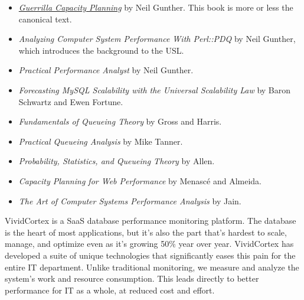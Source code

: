 \documentclass{vivid_layout}
\begin{document}
\begin{itemize}
\item \href{http://www.springer.com/book/978-3-540-26138-4}{\itshape Guerrilla Capacity Planning} by Neil Gunther. This book is more or less the canonical text.
\item {\itshape Analyzing Computer System Performance With Perl::PDQ} by Neil
Gunther, which introduces the background to the USL.
\item {\itshape Practical Performance Analyst} by Neil Gunther.
\item {\itshape Forecasting MySQL Scalability with the Universal Scalability Law} by Baron Schwartz and Ewen Fortune.
\item {\itshape Fundamentals of Queueing Theory} by Gross and Harris.
\item {\itshape Practical Queueing Analysis} by Mike Tanner.
\item {\itshape Probability, Statistics, and Queueing Theory} by Allen.
\item {\itshape Capacity Planning for Web Performance} by Menasc\'e and Almeida.
\item {\itshape The Art of Computer Systems Performance Analysis} by Jain.
\end{itemize}

\newpage

\begin{about}	%
VividCortex is a SaaS database performance monitoring platform. The database is the heart of most applications, but it's also the part that's hardest to scale, manage, and optimize even as it's growing 50\% year over year. VividCortex has developed a suite of unique technologies that significantly eases this pain for the entire IT department. Unlike traditional monitoring, we measure
and analyze the system's work and resource consumption. This leads directly to better performance for IT as a whole, at reduced cost and effort.
\end{about}
\makeresources	%
\end{document}
